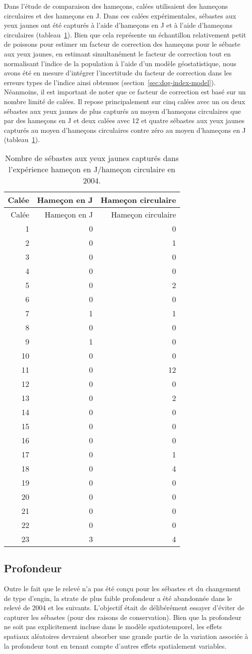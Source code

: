 \documentclass[french,11pt]{book}
\begin{document}
Dans l'étude de comparaison des hameçons,  calées utilisaient des hameçons circulaires et  des hameçons en J. Dans ces calées expérimentales,  sébastes aux yeux jaunes ont été capturés à l'aide d'hameçons en J et  à l'aide d'hameçons circulaires (tableau~\ref{tab:dogfish-hook-comparison}). Bien que cela représente un échantillon relativement petit de poissons pour estimer un facteur de correction des hameçons pour le sébaste aux yeux jaunes, en estimant simultanément le facteur de correction tout en normalisant l'indice de la population à l'aide d'un modèle géostatistique, nous avons été en mesure d'intégrer l'incertitude du facteur de correction dans les erreurs types de l'indice ainsi obtenues (section~\ref{sec:dog-index-model}). Néanmoins, il est important de noter que ce facteur de correction est basé sur un nombre limité de calées. Il repose principalement sur cinq calées avec un ou deux sébastes aux yeux jaunes de plus capturés au moyen d'hameçons circulaires que par des hameçons en J et deux calées avec 12 et quatre sébastes aux yeux jaunes capturés au moyen d'hameçons circulaires contre zéro au moyen d'hameçons en J (tableau~\ref{tab:dogfish-hook-comparison}).
\begin{longtable}[]{@{}rrr@{}}
\caption{\label{tab:dogfish-hook-comparison}Nombre de sébastes aux yeux jaunes capturés dans l'expérience hameçon en J/hameçon circulaire en 2004.}\tabularnewline
\toprule
Calée & Hameçon en J & Hameçon circulaire\tabularnewline
\midrule
\endfirsthead
\toprule
Calée & Hameçon en J & Hameçon circulaire\tabularnewline
\midrule
\endhead
1 & 0 & 0\tabularnewline
2 & 0 & 1\tabularnewline
3 & 0 & 0\tabularnewline
4 & 0 & 0\tabularnewline
5 & 0 & 2\tabularnewline
6 & 0 & 0\tabularnewline
7 & 1 & 1\tabularnewline
8 & 0 & 0\tabularnewline
9 & 1 & 0\tabularnewline
10 & 0 & 0\tabularnewline
11 & 0 & 12\tabularnewline
12 & 0 & 0\tabularnewline
13 & 0 & 2\tabularnewline
14 & 0 & 0\tabularnewline
15 & 0 & 0\tabularnewline
16 & 0 & 0\tabularnewline
17 & 0 & 1\tabularnewline
18 & 0 & 4\tabularnewline
19 & 0 & 0\tabularnewline
20 & 0 & 0\tabularnewline
21 & 0 & 0\tabularnewline
22 & 0 & 0\tabularnewline
23 & 3 & 4\tabularnewline
\bottomrule
\end{longtable}
\hypertarget{sec:dog-depth}{%
\subsection{Profondeur}\label{sec:dog-depth}}

Outre le fait que le relevé n'a pas été conçu pour les sébastes et du changement de type d'engin, la strate de plus faible profondeur a été abandonnée dans le relevé de 2004 et les suivants. L'objectif était de délibérément essayer d'éviter de capturer les sébastes (pour des raisons de conservation). Bien que la profondeur ne soit pas explicitement incluse dans le modèle spatiotemporel, les effets spatiaux aléatoires devraient absorber une grande partie de la variation associée à la profondeur tout en tenant compte d'autres effets spatialement variables.
\end{document}
